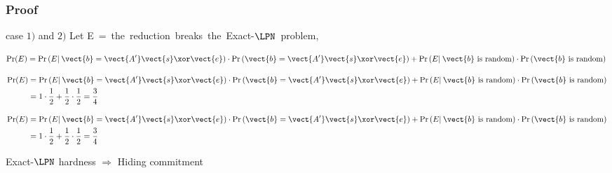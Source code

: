 \begin{frame}
\frametitle{Proof}

  \begin{center}
  \end{center}

  \begin{block}{case $1)$ and $2)$ }
  Let \mbox{E = {the reduction breaks the Exact-$\LPN$ problem}},  
  \begin{overprint}
  \begin{equation*}
     \Pr(E) = \Pr \left( E | \:\vect{b}  = \vect{A'} \vect{s} \xor \vect{e}  \right)  \cdot  \Pr \left( \vect{b}  = \vect{A'} \vect{s} \xor \vect{e}  \right)  + \Pr \left( E   | \: \vect{b} \text{ is random}  \right)   \cdot \Pr \left(   \vect{b} \text{ is random} \right) \\
  \end{equation*}

  \begin{align*}
    \Pr(E) &= \Pr \left( E | \:\vect{b}  = \vect{A'} \vect{s} \xor \vect{e}  \right)  \cdot  \Pr \left( \vect{b}  = \vect{A'} \vect{s} \xor \vect{e}  \right)  + \Pr \left( E   | \: \vect{b} \text{ is random}  \right)   \cdot \Pr \left(   \vect{b} \text{ is random} \right) \\
	  &=  1  \cdot   \frac{1}{2}  +  \frac{1}{2}  \cdot  \frac{1}{2} = \frac{3}{4} 
  \end{align*}

  \begin{align*}
    \Pr(E) &= \Pr \left( E | \:\vect{b}  = \vect{A'} \vect{s} \xor \vect{e}  \right)  \cdot  \Pr \left( \vect{b}  = \vect{A'} \vect{s} \xor \vect{e}  \right)  + \Pr \left( E   | \: \vect{b} \text{ is random}  \right)   \cdot \Pr \left(   \vect{b} \text{ is random} \right) \\
	  &=  1  \cdot   \frac{1}{2}  +  \frac{1}{2}  \cdot  \frac{1}{2} = \frac{3}{4} 
  \end{align*}
  \begin{center}   
  \alert{Exact-$\LPN$ hardness $\Rightarrow$ Hiding commitment}
  \end{center}  
  \end{overprint}

  \end{block}

\end{frame}

 